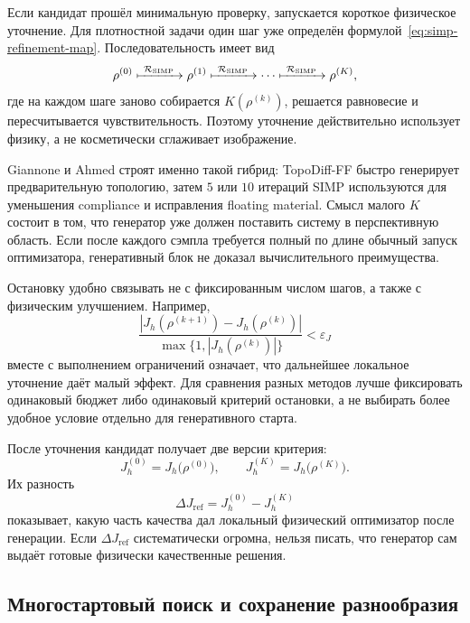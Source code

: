 Если кандидат прошёл минимальную проверку, запускается короткое физическое уточнение. Для плотностной задачи один шаг уже определён формулой~\eqref{eq:simp-refinement-map}. Последовательность имеет вид
\begin{equation}
 \rho^{(0)}
 \xmapsto{\ \mathcal R_{\mathrm{SIMP}}\ }
 \rho^{(1)}
 \xmapsto{\ \mathcal R_{\mathrm{SIMP}}\ }
 \cdots
 \xmapsto{\ \mathcal R_{\mathrm{SIMP}}\ }
 \rho^{(K)},
\end{equation}
где на каждом шаге заново собирается $K(\rho^{(k)})$, решается равновесие и пересчитывается чувствительность. Поэтому уточнение действительно использует физику, а не косметически сглаживает изображение.

Giannone и Ahmed строят именно такой гибрид: TopoDiff-FF быстро генерирует предварительную топологию, затем $5$ или $10$ итераций SIMP используются для уменьшения compliance и исправления floating material. Смысл малого $K$ состоит в том, что генератор уже должен поставить систему в перспективную область. Если после каждого сэмпла требуется полный по длине обычный запуск оптимизатора, генеративный блок не доказал вычислительного преимущества.

Остановку удобно связывать не с фиксированным числом шагов, а также с физическим улучшением. Например,
\begin{equation}
 \frac{
  \left|J_h(\rho^{(k+1)})-J_h(\rho^{(k)})\right|
 }{
  \max\{1,|J_h(\rho^{(k)})|\}
 }
 <\varepsilon_J
\end{equation}
вместе с выполнением ограничений означает, что дальнейшее локальное уточнение даёт малый эффект. Для сравнения разных методов лучше фиксировать одинаковый бюджет либо одинаковый критерий остановки, а не выбирать более удобное условие отдельно для генеративного старта.

После уточнения кандидат получает две версии критерия:
\begin{equation}
 J_h^{(0)}=J_h\bigl(\rho^{(0)}\bigr),
 \qquad
 J_h^{(K)}=J_h\bigl(\rho^{(K)}\bigr).
\end{equation}
Их разность
\begin{equation}
 \Delta J_{\mathrm{ref}}
 =
 J_h^{(0)}-J_h^{(K)}
\end{equation}
показывает, какую часть качества дал локальный физический оптимизатор после генерации. Если $\Delta J_{\mathrm{ref}}$ систематически огромна, нельзя писать, что генератор сам выдаёт готовые физически качественные решения.

\subsection{Многостартовый поиск и сохранение разнообразия}

